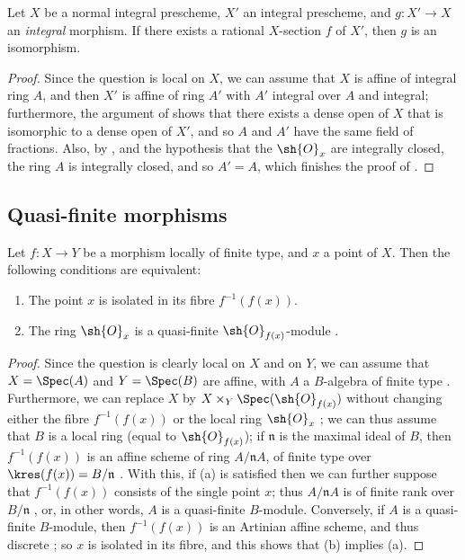\begin{corollary}[6.1.15]
\label{II.6.1.15}
Let $X$ be a normal integral prescheme, $X'$ an integral prescheme, and $g:X'\to X$ an \emph{integral} morphism.
If there exists a rational $X$-section $f$ of $X'$, then $g$ is an isomorphism.
\end{corollary}

\begin{proof}
Since the question is local on $X$, we can assume that $X$ is affine of integral ring $A$, and then $X'$ is affine of ring $A'$ with $A'$ integral over $A$  and integral;
furthermore, the argument of  shows that there exists a dense open of $X$ that is isomorphic to a dense open of $X'$, and so $A$ and $A'$ have the same field of fractions.
Also, by , and the hypothesis that the $\sh{O}_x$ are integrally closed, the ring $A$ is integrally closed, and so $A'=A$, which finishes the proof of .
\end{proof}


\subsection{Quasi-finite morphisms}
\label{subsection:II.6.2}

\begin{proposition}[6.2.1]
\label{II.6.2.1}
Let $f:X\to Y$ be a morphism locally of finite type, and $x$ a point of $X$.
Then the following conditions are equivalent:
\begin{enumerate}
  \item[a)] The point $x$ is isolated in its fibre $f^{-1}(f(x))$.
  \item[b)] The ring $\sh{O}_x$ is a quasi-finite $\sh{O}_{f(x)}$-module .
\end{enumerate}
\end{proposition}

\begin{proof}
Since the question is clearly local on $X$ and on $Y$, we can assume that $X=\Spec(A)$ and $Y=\Spec(B)$ are affine, with $A$ a $B$-algebra of finite type .
Furthermore, we can replace $X$ by $X\times_Y\Spec(\sh{O}_{f(x)})$ without changing either the fibre $f^{-1}(f(x))$ or the local ring $\sh{O}_x$ ;
we can thus assume that $B$ is a local ring (equal to $\sh{O}_{f(x)}$);
if $\mathfrak{n}$ is the maximal ideal of $B$, then $f^{-1}(f(x))$ is an affine scheme of ring $A/\mathfrak{n}A$, of finite type over $\kres(f(x))=B/\mathfrak{n}$ .
With this, if (a) is satisfied then we can further suppose that $f^{-1}(f(x))$ consists of the single point $x$;
thus $A/\mathfrak{n}A$ is of finite rank over $B/\mathfrak{n}$ , or, in other words, $A$ is a quasi-finite $B$-module.
Conversely, if $A$ is a quasi-finite $B$-module, then $f^{-1}(f(x))$ is an Artinian affine scheme, and thus discrete ;
so $x$ is isolated in its fibre, and this shows that (b) implies (a).
\end{proof}

